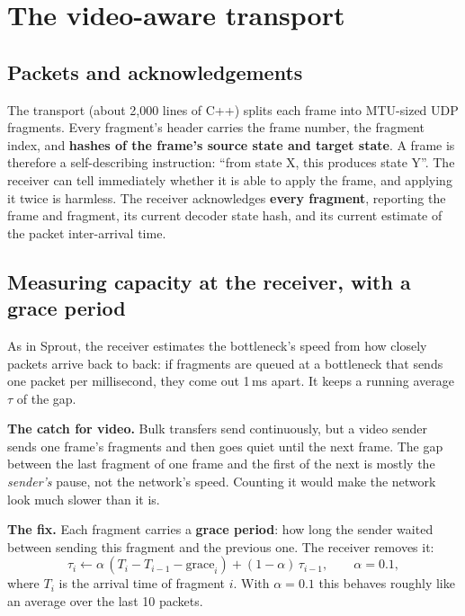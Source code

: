 \section{The video-aware transport}

\subsection{Packets and acknowledgements}
The transport (about 2,000 lines of C++) splits each frame into MTU-sized UDP fragments. Every fragment's header carries the frame number, the
fragment index, and \textbf{hashes of the frame's source state and target state}. A frame is therefore a self-describing instruction: ``from state X,
this produces state Y''. The receiver can tell immediately whether it is able to apply the frame, and applying it twice is harmless. The receiver
acknowledges \textbf{every fragment}, reporting the frame and fragment, its current decoder state hash, and its current estimate of the packet
inter-arrival time.

\subsection{Measuring capacity at the receiver, with a grace period}

As in Sprout, the receiver estimates the bottleneck's speed from how closely packets arrive back to back: if fragments are queued at a bottleneck
that sends one packet per millisecond, they come out 1\,ms apart. It keeps a running average $\tau$ of the gap.

\textbf{The catch for video.} Bulk transfers send continuously, but a video sender sends one frame's fragments and then goes quiet until the next frame.
The gap between the last fragment of one frame and the first of the next is mostly the \emph{sender's} pause, not the network's speed. Counting it
would make the network look much slower than it is.

\textbf{The fix.} Each fragment carries a \textbf{grace period}: how long the sender waited between sending this fragment and the previous one. The receiver
removes it:
\[
  \tau_i \leftarrow \alpha\,(T_i - T_{i-1} - \text{grace}_i) + (1 - \alpha)\,\tau_{i-1},\qquad \alpha = 0.1,
\]
where $T_i$ is the arrival time of fragment $i$. With $\alpha = 0.1$ this behaves roughly like an average over the last 10 packets.

